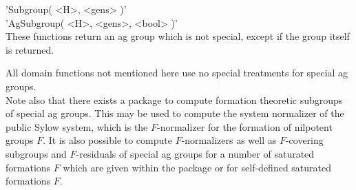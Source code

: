 \vspace{.5cm}
'Subgroup( <H>, <gens> )' \\
'AgSubgroup( <H>, <gens>, <bool> )' \\
These functions return an ag group which is not special, except if the
group itself is returned.

\vspace{.5cm}
All domain functions not mentioned here use no special treatments for
special ag groups. \\

Note also that there exists a package to compute formation theoretic
subgroups of special ag groups. This may be used to compute the
system normalizer of the public Sylow system, which is the $F$-normalizer
for the formation of nilpotent groups $F$. It is also possible to 
compute $F$-normalizers as well as $F$-covering subgroups and 
$F$-residuals of special ag groups for a number of saturated formations
$F$ which are given within the package or for self-defined saturated
formations $F$. 
